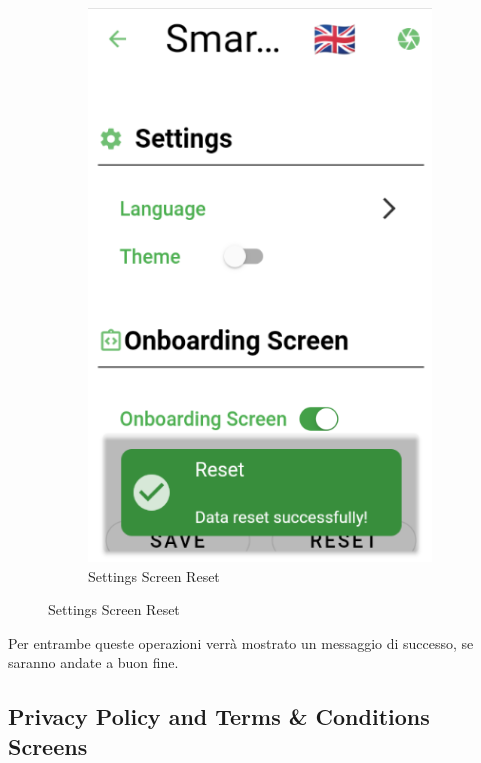 \documentclass[a4paper,12pt]{report}
\begin{document}
\begin{figure}[H]
\begin{subfigure}{0.3\textwidth}
		\includegraphics[width=\textwidth]{./images/settings/settings_screen_reset.png}
		\caption{Settings Screen Reset} %
		\label{fig:settings_reset}
	\end{subfigure}
\end{figure}

\textsf{\small Per entrambe queste operazioni verrà mostrato un messaggio di successo, se saranno andate a buon fine.}

\subsection{Privacy Policy and Terms \& Conditions Screens}
\end{document}
